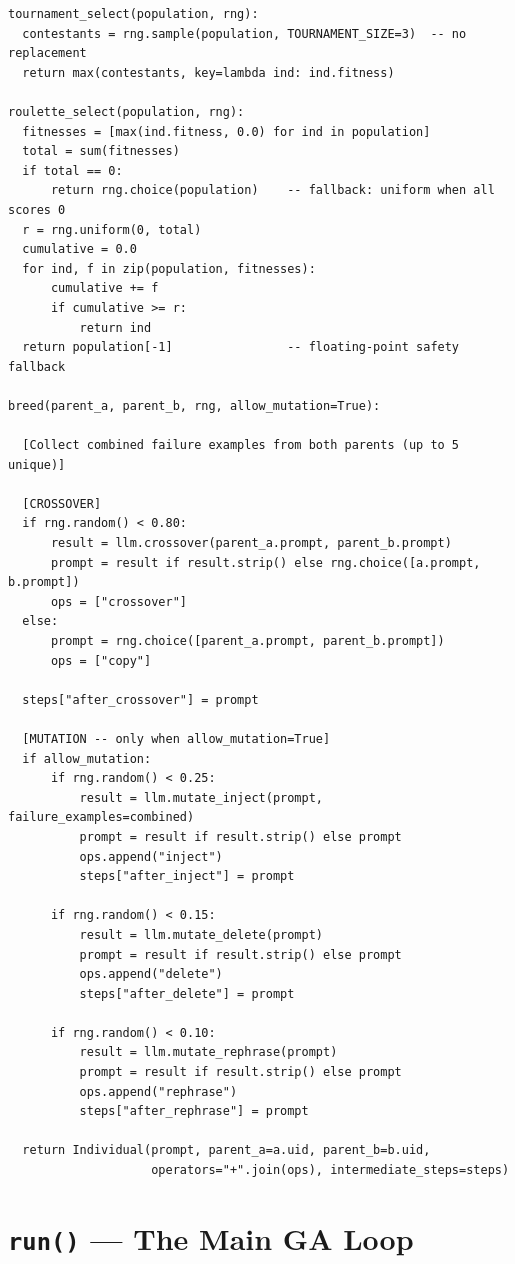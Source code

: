 \documentclass[11pt,a4paper]{report}
\newcommand{\fn}[1]{\texttt{#1}}
\begin{document}
\begin{lstlisting}[style=chain]
tournament_select(population, rng):
  contestants = rng.sample(population, TOURNAMENT_SIZE=3)  -- no replacement
  return max(contestants, key=lambda ind: ind.fitness)

roulette_select(population, rng):
  fitnesses = [max(ind.fitness, 0.0) for ind in population]
  total = sum(fitnesses)
  if total == 0:
      return rng.choice(population)    -- fallback: uniform when all scores 0
  r = rng.uniform(0, total)
  cumulative = 0.0
  for ind, f in zip(population, fitnesses):
      cumulative += f
      if cumulative >= r:
          return ind
  return population[-1]                -- floating-point safety fallback

breed(parent_a, parent_b, rng, allow_mutation=True):

  [Collect combined failure examples from both parents (up to 5 unique)]

  [CROSSOVER]
  if rng.random() < 0.80:
      result = llm.crossover(parent_a.prompt, parent_b.prompt)
      prompt = result if result.strip() else rng.choice([a.prompt, b.prompt])
      ops = ["crossover"]
  else:
      prompt = rng.choice([parent_a.prompt, parent_b.prompt])
      ops = ["copy"]

  steps["after_crossover"] = prompt

  [MUTATION -- only when allow_mutation=True]
  if allow_mutation:
      if rng.random() < 0.25:
          result = llm.mutate_inject(prompt, failure_examples=combined)
          prompt = result if result.strip() else prompt
          ops.append("inject")
          steps["after_inject"] = prompt

      if rng.random() < 0.15:
          result = llm.mutate_delete(prompt)
          prompt = result if result.strip() else prompt
          ops.append("delete")
          steps["after_delete"] = prompt

      if rng.random() < 0.10:
          result = llm.mutate_rephrase(prompt)
          prompt = result if result.strip() else prompt
          ops.append("rephrase")
          steps["after_rephrase"] = prompt

  return Individual(prompt, parent_a=a.uid, parent_b=b.uid,
                    operators="+".join(ops), intermediate_steps=steps)
\end{lstlisting}

\section{\fn{run()} --- The Main GA Loop}
\end{document}
